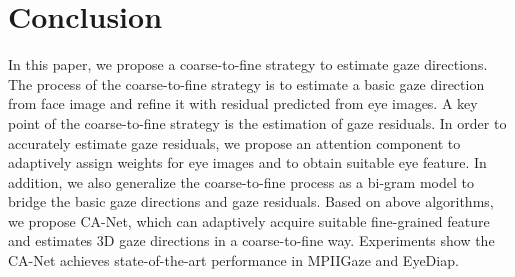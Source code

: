 \documentclass[letterpaper]{article} %
\begin{document}
\section{Conclusion}
In this paper, we propose a coarse-to-fine strategy to estimate gaze directions.
The process of the coarse-to-fine strategy is to estimate a basic gaze direction from face image and refine it with residual predicted from eye images.
A key point of the coarse-to-fine strategy is the estimation of gaze residuals.
In order to accurately estimate gaze residuals, we propose an attention component to adaptively assign weights for eye images and to obtain suitable eye feature.
In addition, we also generalize the coarse-to-fine process as a bi-gram model to bridge the basic gaze directions and gaze residuals. 
Based on above algorithms, we propose CA-Net, which can adaptively acquire suitable fine-grained feature and estimates 3D gaze directions in a coarse-to-fine way.
Experiments show the CA-Net achieves state-of-the-art performance in MPIIGaze and EyeDiap.


\end{document}
